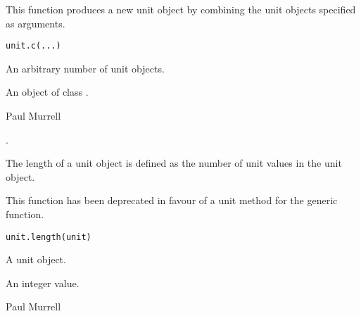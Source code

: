 %
\begin{Description}\relax
This function produces a new unit object by combining the
unit objects specified as arguments.
\end{Description}
%
\begin{Usage}
\begin{verbatim}
unit.c(...)
\end{verbatim}
\end{Usage}
%
\begin{Arguments}
\begin{ldescription}
\item[\code{...}] An arbitrary number of unit objects.
\end{ldescription}
\end{Arguments}
%
\begin{Value}
An object of class .
\end{Value}
%
\begin{Author}\relax
Paul Murrell
\end{Author}
%
\begin{SeeAlso}\relax
{}.
\end{SeeAlso}
%
\begin{Description}\relax
The length of a unit object is defined as the number of unit
values in the unit object.

This function has been deprecated in favour of a unit method for
the generic  function.
\end{Description}
%
\begin{Usage}
\begin{verbatim}
unit.length(unit)
\end{verbatim}
\end{Usage}
%
\begin{Arguments}
\begin{ldescription}
\item[\code{unit}] A unit object.
\end{ldescription}
\end{Arguments}
%
\begin{Value}
An integer value.
\end{Value}
%
\begin{Author}\relax
Paul Murrell
\end{Author}
%
\begin{SeeAlso}\relax
{}
\end{SeeAlso}
